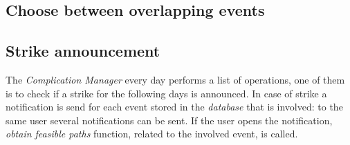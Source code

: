 \subsection{Choose between overlapping events}
		\noindent{}
\subsection{Strike announcement}
		\noindent{}
		The \textit{Complication Manager} every day performs a list of operations, one of them is to check if a strike for the following days is announced. 
		In case of strike a notification is send for each event stored in the \textit{database} that is involved: to the same user several notifications can be sent. 
		If the user opens the notification, \textit{obtain feasible paths} function, related to the involved event, is called.